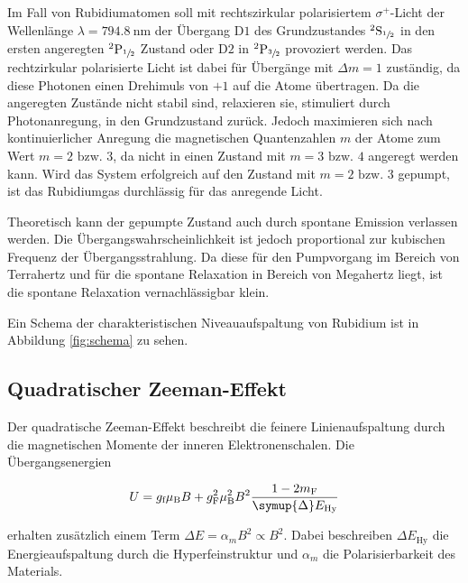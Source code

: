 Im Fall von Rubidiumatomen soll mit rechtszirkular polarisiertem $\sigma^+$-Licht 
der Wellenlänge $\lambda = \SI{794.8}{\nano\meter}$ der Übergang $\text{D}1$ des Grundzustandes $^2\text{S}_{\sfrac{1}{2}}$ in den 
ersten angeregten $^2\text{P}_{\sfrac{1}{2}}$ Zustand oder $\text{D}2$ in $^2\text{P}_{\sfrac{3}{2}}$ provoziert werden. Das rechtzirkular 
polarisierte Licht ist dabei für Übergänge mit $\Delta m = 1$ zuständig,
da diese Photonen einen Drehimuls von $+1$ auf die Atome übertragen.
Da die angeregten Zustände nicht stabil sind, relaxieren sie, stimuliert durch Photonanregung, in den Grundzustand zurück. 
Jedoch maximieren sich nach kontinuierlicher Anregung die magnetischen Quantenzahlen $m$ der Atome zum Wert $m = 2 \text{ bzw. }3$, 
da nicht in einen Zustand mit $m = 3 \text{ bzw. } 4$ angeregt werden kann. Wird das System erfolgreich auf den Zustand 
mit $m = 2 \text{ bzw. } 3$ gepumpt, ist das Rubidiumgas durchlässig für das anregende Licht.

Theoretisch kann der gepumpte Zustand auch durch spontane Emission verlassen werden. Die Übergangswahrscheinlichkeit ist jedoch
proportional zur kubischen Frequenz der Übergangsstrahlung. Da diese für den Pumpvorgang im Bereich von Terrahertz und für die 
spontane Relaxation in Bereich von Megahertz liegt, ist die spontane Relaxation vernachlässigbar klein.

Ein Schema der charakteristischen Niveauaufspaltung von Rubidium ist in Abbildung \ref{fig:schema} zu sehen.

\subsection{Quadratischer Zeeman-Effekt}

Der quadratische Zeeman-Effekt beschreibt die feinere Linienaufspaltung durch die magnetischen Momente der inneren
Elektronenschalen. Die Übergangsenergien

\begin{equation}
    U = g_\text{f}\mu_\text{B} B + g_\text{F}^2\mu_\text{B}^2 B^2 \frac{1-2 m_\text{F}}{\symup{\Delta}E_\text{Hy}}
    \label{eqn:quad} 
\end{equation}

erhalten zusätzlich einem Term $\Delta E = \alpha_m B^2 \propto B^2$. Dabei beschreiben ${\Delta}E_\text{Hy}$ die Energieaufspaltung 
durch die Hyperfeinstruktur und $\alpha_m$ die Polarisierbarkeit des Materials.


